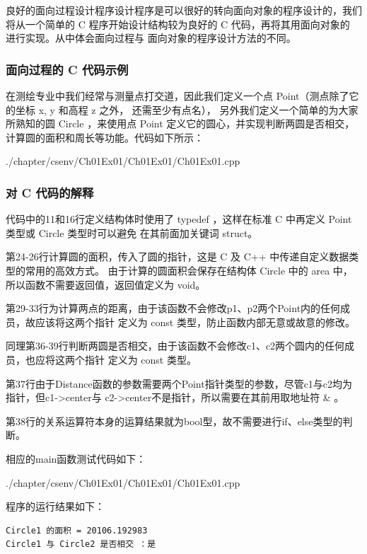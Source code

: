 良好的面向过程设计程序设计程序是可以很好的转向面向对象的程序设计的，我们将从一个简单的
C 程序开始设计结构较为良好的 C 代码，再将其用面向对象的 \cs 进行实现。从中体会面向过程与
面向对象的程序设计方法的不同。

\subsubsection{面向过程的 C 代码示例}

在测绘专业中我们经常与测量点打交道，因此我们定义一个点 Point（测点除了它的坐标 x, y 和高程 z 之外，
还需至少有点名），
另外我们定义一个简单的为大家所熟知的圆 Circle ，来使用点 Point 定义它的圆心，并实现判断两圆是否相交，
计算圆的面积和周长等功能。代码如下所示：


{./chapter/csenv/Ch01Ex01/Ch01Ex01/Ch01Ex01.cpp}



\subsubsection{对 C 代码的解释}
代码中的11和16行定义结构体时使用了 typedef ，这样在标准 C 中再定义 Point 类型或 Circle 类型时可以避免
在其前面加关键词 struct。

第24-26行计算圆的面积，传入了圆的指针，这是 C 及 C++ 中传递自定义数据类型的常用的高效方式。
由于计算的圆面积会保存在结构体 Circle 中的 area 中，所以函数不需要返回值，返回值定义为 void。

第29-33行为计算两点的距离，由于该函数不会修改p1、p2两个Point内的任何成员，故应该将这两个指针
定义为 const 类型，防止函数内部无意或故意的修改。

同理第36-39行判断两圆是否相交，由于该函数不会修改c1、c2两个圆内的任何成员，也应将这两个指针
定义为 const 类型。

第37行由于Distance函数的参数需要两个Point指针类型的参数，尽管c1与c2均为指针，但c1->center与
c2->center不是指针，所以需要在其前用取地址符 \& 。

第38行的关系运算符本身的运算结果就为bool型，故不需要进行if、else类型的判断。

相应的main函数测试代码如下：


{./chapter/csenv/Ch01Ex01/Ch01Ex01/Ch01Ex01.cpp}

程序的运行结果如下：
\begin{verbatim}
Circle1 的面积 = 20106.192983
Circle1 与 Circle2 是否相交 ：是
\end{verbatim}


